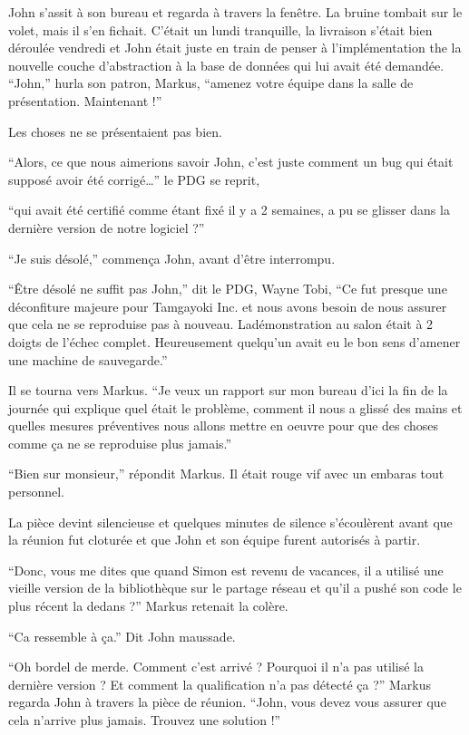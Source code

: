 \begin{trenches}
John s'assit à son bureau et regarda à travers la fenêtre.
La bruine tombait sur le volet, mais il s'en fichait.
C'était un lundi tranquille, la livraison s'était bien déroulée vendredi et John était juste en train de penser à l'implémentation the la nouvelle couche d'abstraction à la base de données qui lui avait été demandée.
``John,'' hurla son patron, Markus, ``amenez votre équipe dans la salle de présentation. Maintenant !''

Les choses ne se présentaient pas bien.

\thoughtbreak

``Alors, ce que nous aimerions savoir John, c'est juste comment un bug qui était supposé avoir été corrigé\ldots'' le PDG se reprit,

``qui avait été certifié comme étant fixé il y a 2 semaines, a pu se glisser dans la dernière version de notre logiciel ?''

``Je suis désolé,'' commença John, avant d'être interrompu.

``Être désolé ne suffit pas John,'' dit le PDG, Wayne Tobi,
``Ce fut presque une déconfiture majeure pour Tamgayoki Inc. et nous avons besoin de nous assurer que cela ne se reproduise pas à nouveau. Ladémonstration au salon était à 2 doigts de l'échec complet. Heureusement quelqu'un avait eu le bon sens d'amener une machine de sauvegarde.''

Il se tourna vers Markus.
``Je veux un rapport sur mon bureau d'ici la fin de la journée qui explique quel était le problème, comment il nous a glissé des mains et quelles mesures préventives nous allons mettre en oeuvre pour que des choses comme ça ne se reproduise plus jamais.''

``Bien sur monsieur,'' répondit Markus.
Il était rouge vif avec un embaras tout personnel.

La pièce devint silencieuse et quelques minutes de silence s'écoulèrent avant que la réunion fut cloturée et que John et son équipe furent autorisés à partir.

\thoughtbreak

``Donc, vous me dites que quand Simon est revenu de vacances, il a utilisé une vieille version de la bibliothèque sur le partage réseau et qu'il a pushé son code le plus récent la dedans ?'' Markus retenait la colère.

``Ca ressemble à ça.'' Dit John maussade.

``Oh bordel de merde. Comment c'est arrivé ? Pourquoi il n'a pas utilisé la dernière version ? Et comment la qualification n'a pas détecté ça ?'' Markus regarda John à travers la pièce de réunion.
``John, vous devez vous assurer que cela n'arrive plus jamais. Trouvez une solution !''

\end{trenches}

